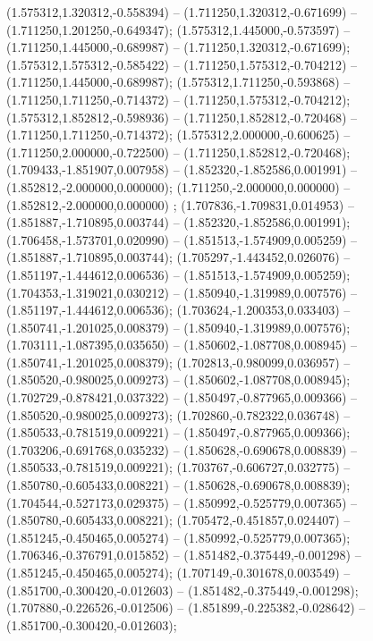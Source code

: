  (1.575312,1.320312,-0.558394) -- (1.711250,1.320312,-0.671699) -- (1.711250,1.201250,-0.649347);
 (1.575312,1.445000,-0.573597) -- (1.711250,1.445000,-0.689987) -- (1.711250,1.320312,-0.671699);
 (1.575312,1.575312,-0.585422) -- (1.711250,1.575312,-0.704212) -- (1.711250,1.445000,-0.689987);
 (1.575312,1.711250,-0.593868) -- (1.711250,1.711250,-0.714372) -- (1.711250,1.575312,-0.704212);
 (1.575312,1.852812,-0.598936) -- (1.711250,1.852812,-0.720468) -- (1.711250,1.711250,-0.714372);
 (1.575312,2.000000,-0.600625) -- (1.711250,2.000000,-0.722500) -- (1.711250,1.852812,-0.720468);
 (1.709433,-1.851907,0.007958) -- (1.852320,-1.852586,0.001991) -- (1.852812,-2.000000,0.000000);
 (1.711250,-2.000000,0.000000) -- (1.852812,-2.000000,0.000000) ;
 (1.707836,-1.709831,0.014953) -- (1.851887,-1.710895,0.003744) -- (1.852320,-1.852586,0.001991);
 (1.706458,-1.573701,0.020990) -- (1.851513,-1.574909,0.005259) -- (1.851887,-1.710895,0.003744);
 (1.705297,-1.443452,0.026076) -- (1.851197,-1.444612,0.006536) -- (1.851513,-1.574909,0.005259);
 (1.704353,-1.319021,0.030212) -- (1.850940,-1.319989,0.007576) -- (1.851197,-1.444612,0.006536);
 (1.703624,-1.200353,0.033403) -- (1.850741,-1.201025,0.008379) -- (1.850940,-1.319989,0.007576);
 (1.703111,-1.087395,0.035650) -- (1.850602,-1.087708,0.008945) -- (1.850741,-1.201025,0.008379);
 (1.702813,-0.980099,0.036957) -- (1.850520,-0.980025,0.009273) -- (1.850602,-1.087708,0.008945);
 (1.702729,-0.878421,0.037322) -- (1.850497,-0.877965,0.009366) -- (1.850520,-0.980025,0.009273);
 (1.702860,-0.782322,0.036748) -- (1.850533,-0.781519,0.009221) -- (1.850497,-0.877965,0.009366);
 (1.703206,-0.691768,0.035232) -- (1.850628,-0.690678,0.008839) -- (1.850533,-0.781519,0.009221);
 (1.703767,-0.606727,0.032775) -- (1.850780,-0.605433,0.008221) -- (1.850628,-0.690678,0.008839);
 (1.704544,-0.527173,0.029375) -- (1.850992,-0.525779,0.007365) -- (1.850780,-0.605433,0.008221);
 (1.705472,-0.451857,0.024407) -- (1.851245,-0.450465,0.005274) -- (1.850992,-0.525779,0.007365);
 (1.706346,-0.376791,0.015852) -- (1.851482,-0.375449,-0.001298) -- (1.851245,-0.450465,0.005274);
 (1.707149,-0.301678,0.003549) -- (1.851700,-0.300420,-0.012603) -- (1.851482,-0.375449,-0.001298);
 (1.707880,-0.226526,-0.012506) -- (1.851899,-0.225382,-0.028642) -- (1.851700,-0.300420,-0.012603);
